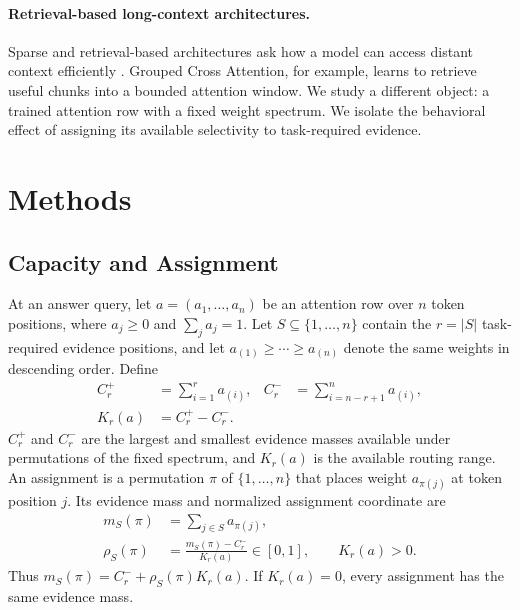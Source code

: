 \documentclass[letterpaper]{article} %
\begin{document}
\paragraph{Retrieval-based long-context architectures.}
Sparse and retrieval-based architectures ask how a model can access distant context efficiently
\citep{sparselong,hu2025causalretrieval}. Grouped Cross Attention, for example, learns to retrieve useful
chunks into a bounded attention window. We study a different object: a trained attention row with a fixed
weight spectrum. We isolate the behavioral effect of assigning its available selectivity to
task-required evidence.

\section{Methods}

\subsection{Capacity and Assignment}

At an answer query, let $a=(a_1,\ldots,a_n)$ be an attention row over $n$ token positions, where $a_j\ge0$
and $\sum_j a_j=1$. Let $S\subseteq\{1,\ldots,n\}$ contain the $r=|S|$ task-required evidence positions,
and let $a_{(1)}\ge\cdots\ge a_{(n)}$ denote the same weights in descending order. Define
\begin{equation}
\begin{aligned}
 C_r^+&=\sum_{i=1}^{r}a_{(i)}, &
 C_r^-&=\sum_{i=n-r+1}^{n}a_{(i)},\\
 K_r(a)&=C_r^+-C_r^-.
\end{aligned}
\label{eq:capacity}
\end{equation}
$C_r^+$ and $C_r^-$ are the largest and smallest evidence masses available under permutations of the fixed
spectrum, and $K_r(a)$ is the available routing range. An assignment is a permutation $\pi$ of
$\{1,\ldots,n\}$ that places weight $a_{\pi(j)}$ at token position $j$. Its evidence mass and normalized
assignment coordinate are
\begin{equation}
\begin{aligned}
 m_S(\pi)&=\sum_{j\in S}a_{\pi(j)},\\
 \rho_S(\pi)&=\frac{m_S(\pi)-C_r^-}{K_r(a)}\in[0,1],\qquad K_r(a)>0.
\end{aligned}
\label{eq:assignment-coordinate}
\end{equation}
Thus $m_S(\pi)=C_r^-+\rho_S(\pi)K_r(a)$. If $K_r(a)=0$, every assignment has the same evidence mass.
\end{document}
